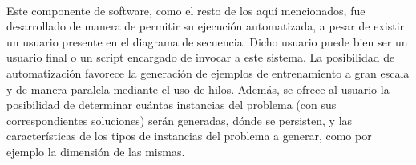 \paragraph{} Este componente de software, como el resto de los aquí mencionados, fue desarrollado de manera de permitir su ejecución automatizada, a pesar de existir un usuario presente en el diagrama de secuencia.
Dicho usuario puede bien ser un usuario final o un script encargado de invocar a este sistema.
La posibilidad de automatización favorece la generación de ejemplos de entrenamiento a gran escala y de manera paralela mediante el uso de hilos.
Además, se ofrece al usuario la posibilidad de determinar cuántas instancias del problema (con sus correspondientes soluciones) serán generadas, dónde se persisten, y las características de los tipos de instancias del problema a generar, como por ejemplo la dimensión de las mismas.